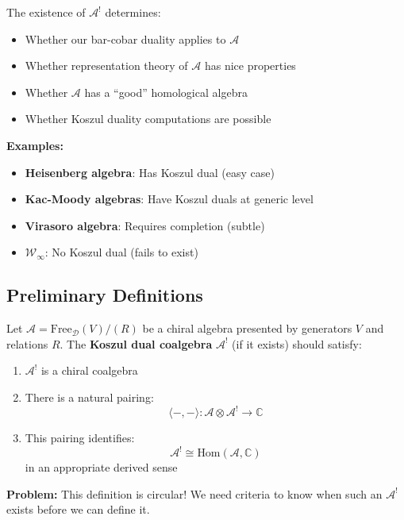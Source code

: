 \begin{remark}\label{rem:why-existence-matters}
The existence of $\mathcal{A}^!$ determines:
\begin{itemize}
\item Whether our bar-cobar duality applies to $\mathcal{A}$
\item Whether representation theory of $\mathcal{A}$ has nice properties
\item Whether $\mathcal{A}$ has a ``good'' homological algebra
\item Whether Koszul duality computations are possible
\end{itemize}

\textbf{Examples:}
\begin{itemize}
\item \textbf{Heisenberg algebra}: Has Koszul dual (easy case)
\item \textbf{Kac-Moody algebras}: Have Koszul duals at generic level
\item \textbf{Virasoro algebra}: Requires completion (subtle)
\item \textbf{$\mathcal{W}_\infty$}: No Koszul dual (fails to exist)
\end{itemize}
\end{remark}

\subsection{Preliminary Definitions}

\begin{definition}\label{def:koszul-dual-tentative}
Let $\mathcal{A} = \text{Free}_{\mathcal{D}}(V) / (R)$ be a chiral algebra presented 
by generators $V$ and relations $R$. The \textbf{Koszul dual coalgebra} $\mathcal{A}^!$ 
(if it exists) should satisfy:
\begin{enumerate}
\item $\mathcal{A}^!$ is a chiral coalgebra
\item There is a natural pairing:
      $$\langle -, - \rangle: \mathcal{A} \otimes \mathcal{A}^! \to \mathbb{C}$$
\item This pairing identifies:
      $$\mathcal{A}^! \cong \text{Hom}(\mathcal{A}, \mathbb{C})$$
      in an appropriate derived sense
\end{enumerate}

\textbf{Problem:} This definition is circular! We need criteria to know when such 
an $\mathcal{A}^!$ exists before we can define it.
\end{definition}

